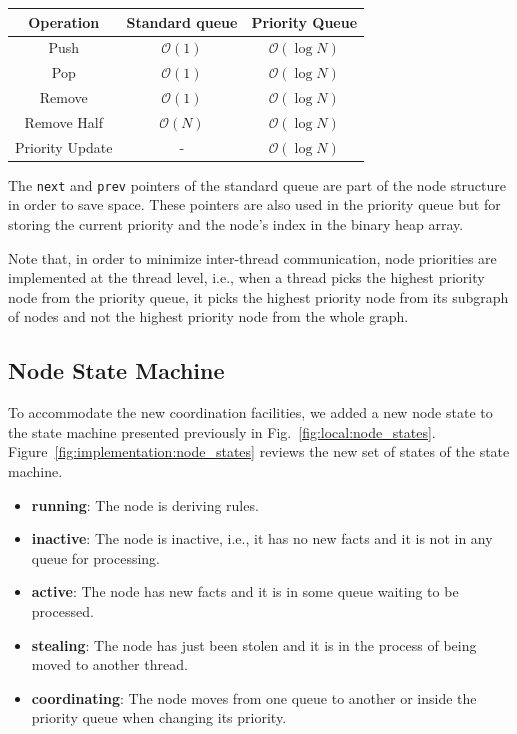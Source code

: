 \begin{table}[h]
   \begin{tabular}{| c | c | c |}
      \hline
      \textbf{Operation} & \textbf{Standard queue} & \textbf{Priority Queue} \\
      \hline
      Push & $\mathcal{O}(1)$ & $\mathcal{O}(\log{N})$ \\ \hline
      Pop & $\mathcal{O}(1)$ & $\mathcal{O}(\log{N})$ \\ \hline
      Remove & $\mathcal{O}(1)$ & $\mathcal{O}(\log{N})$ \\ \hline
      Remove Half & $\mathcal{O}(N)$ & $\mathcal{O}(\log{N})$ \\ \hline
      Priority Update & - & $\mathcal{O}(\log{N})$ \\ \hline
   \end{tabular}
   \label{fig:implementation:table_queue}
\end{table}

The \texttt{next} and \texttt{prev} pointers of the standard queue are part of
the node structure in order to save space. These pointers are also used in the
priority queue but for storing the current priority and the node's index in the binary
heap array. 

Note that, in order to minimize inter-thread communication, node priorities are
implemented at the thread level, i.e., when a thread picks the highest priority
node from the priority queue, it picks the highest priority node from its
subgraph of nodes and not the highest priority node from the whole graph.

\subsection{Node State Machine}\label{sec:node_state_machine}

To accommodate the new coordination facilities, we added a new node state to the
state machine presented previously in Fig.~\ref{fig:local:node_states}.
Figure~\ref{fig:implementation:node_states} reviews the new set of states of
the state machine.

\begin{itemize}
   \item \textbf{running}: The node is deriving rules.
   \item \textbf{inactive}: The node is inactive, i.e., it has no new facts and
      it is not in any
   queue for processing.
   \item \textbf{active}: The node has new facts and it is in some queue waiting
   to be processed.
   \item \textbf{stealing}: The node has just been stolen and it is in the process of being
   moved to another thread.
   \item \textbf{coordinating}: The node moves from one queue to another or
      inside the priority queue when changing its priority.
\end{itemize}

